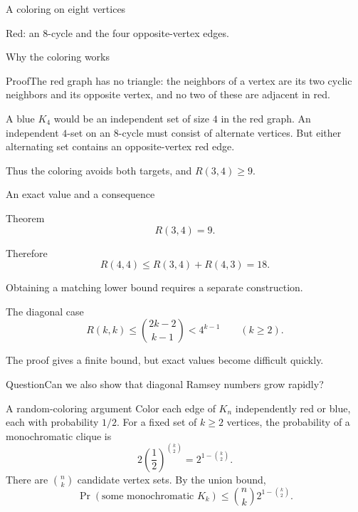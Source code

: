 \documentclass[aspectratio=169,11pt]{beamer}
\newcommand{\Thm}[2]{\begin{block}{#1}#2\end{block}}
\renewcommand{\Proof}[1]{\begin{block}{Proof}\normalsize #1\end{block}}
\newcommand{\Question}[1]{\begin{block}{Question}#1\end{block}}
\newcommand{\gap}{\par\medskip}
\begin{document}
\begin{frame}{A coloring on eight vertices}
\large
\begin{center}\end{center}
\begin{center}Red: an $8$-cycle and the four opposite-vertex edges.\end{center}
\end{frame}
\begin{frame}{Why the coloring works}
\large
\Proof{The red graph has no triangle: the neighbors of a vertex are its two cyclic neighbors and its opposite vertex, and no two of these are adjacent in red.\gap A blue $K_4$ would be an independent set of size $4$ in the red graph. An independent $4$-set on an $8$-cycle must consist of alternate vertices. But either alternating set contains an opposite-vertex red edge.\gap Thus the coloring avoids both targets, and $R(3,4)\geq9$.}
\end{frame}
\begin{frame}{An exact value and a consequence}
\large
\Thm{Theorem}{\[R(3,4)=9.\]}
\gap Therefore
\[R(4,4)\leq R(3,4)+R(4,3)=18.\]
\gap Obtaining a matching lower bound requires a separate construction.
\end{frame}
\begin{frame}{The diagonal case}
\large
\[R(k,k)\leq\binom{2k-2}{k-1}<4^{k-1}\qquad(k\geq2).\]
\gap The proof gives a finite bound, but exact values become difficult quickly.
\Question{Can we also show that diagonal Ramsey numbers grow rapidly?}
\end{frame}
\begin{frame}{A random-coloring argument}
\large
\normalsize
Color each edge of $K_n$ independently red or blue, each with probability $1/2$. For a fixed set of $k\geq2$ vertices, the probability of a monochromatic clique is
\[2\left(\frac12\right)^{\binom{k}{2}}=2^{1-\binom{k}{2}}.\]
There are $\binom nk$ candidate vertex sets. By the union bound,
\[\Pr(\text{some monochromatic }K_k)\leq\binom nk2^{1-\binom{k}{2}}.\]
\end{frame}
\end{document}
